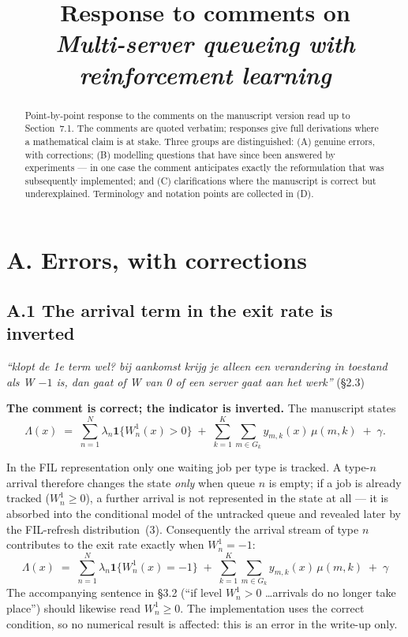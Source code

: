 \documentclass[11pt,a4paper]{article}
\title{Response to comments on\\\emph{Multi-server queueing with reinforcement learning}}
\author{}
\date{}
\newcommand{\comment}[1]{\textcolor{red!70!black}{\textit{``#1''}}}
\begin{document}
\maketitle

\begin{abstract}
\noindent
Point-by-point response to the comments on the manuscript version read up to
Section~7.1.  The comments are quoted verbatim; responses give full
derivations where a mathematical claim is at stake.  Three groups are
distinguished: (A) genuine errors, with corrections; (B) modelling questions
that have since been answered by experiments --- in one case the comment
anticipates exactly the reformulation that was subsequently implemented; and
(C) clarifications where the manuscript is correct but underexplained.
Terminology and notation points are collected in (D).
\end{abstract}

\section*{A. Errors, with corrections}

\subsection*{A.1 The arrival term in the exit rate is inverted}

\comment{klopt de 1e term wel? bij aankomst krijg je alleen een verandering in
toestand als W $-1$ is, dan gaat of W van 0 of een server gaat aan het werk}
\hfill (\S2.3)

\textbf{The comment is correct; the indicator is inverted.}  The manuscript
states
\[
  \Lambda(x) \;=\; \sum_{n=1}^{N}\lambda_n \mathbf{1}\{W_n^1(x) > 0\}
  \;+\; \sum_{k=1}^{K}\sum_{m\in G_k} y_{m,k}(x)\,\mu(m,k) \;+\; \gamma .
\]

In the FIL representation only one waiting job per type is tracked.  A type-$n$
arrival therefore changes the state \emph{only} when queue $n$ is empty; if a
job is already tracked ($W_n^1 \ge 0$), a further arrival is not represented in
the state at all --- it is absorbed into the conditional model of the untracked
queue and revealed later by the FIL-refresh distribution~(3).  Consequently the
arrival stream of type $n$ contributes to the exit rate exactly when
$W_n^1 = -1$:
\[
  \boxed{\;\Lambda(x) \;=\; \sum_{n=1}^{N}\lambda_n \mathbf{1}\{W_n^1(x) = -1\}
  \;+\; \sum_{k=1}^{K}\sum_{m\in G_k} y_{m,k}(x)\,\mu(m,k) \;+\; \gamma\;}
\]
The accompanying sentence in \S3.2 (``if level $W_n^1 > 0$ \ldots arrivals do no
longer take place'') should likewise read $W_n^1 \ge 0$.  The implementation
uses the correct condition, so no numerical result is affected: this is an
error in the write-up only.
\end{document}
